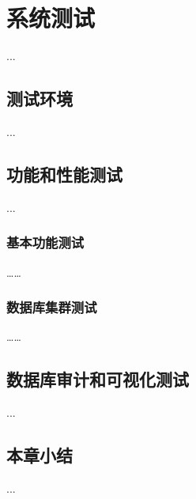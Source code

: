 
\chapter{系统测试}
...
\section{测试环境}
...
\section{功能和性能测试}
...
\subsection{基本功能测试}
……
\subsection{数据库集群测试}
……
\section{数据库审计和可视化测试}
...
\section{本章小结}
...